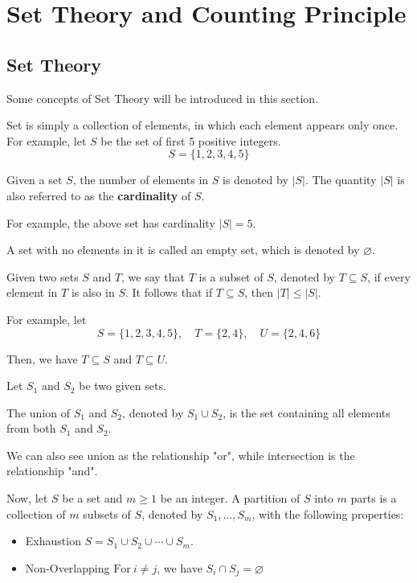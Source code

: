 \chapter{Set Theory and Counting Principle}

\section{Set Theory}

Some concepts of Set Theory will be introduced in this section.

Set is simply a collection of elements, in which each element appears only once. 
For example, let \(S\) be the set of first 5 positive integers.
\[
    S = \{1, 2, 3, 4, 5\}
\]

Given a set \(S\), the number of elements in \(S\) is denoted by \(\vert S \vert \). The quantity \(\vert S \vert \) is also referred to as the \textbf{cardinality} of \(S\).

For example, the above set has cardinality \(\vert S \vert = 5\). 

A set with no elements in it is called an empty set, which is denoted by \(\varnothing\).

Given two sets \(S\) and \(T\), we say that \(T\) is a subset of \(S\), denoted by \(T \subseteq S\), if every element in \(T\) is also in \(S\). It follows that if \(T \subseteq S\), then \(\vert T \vert \leq \vert S \vert \). 

For example, let
\[
    S = \{1, 2, 3, 4, 5\},\quad T = \{2, 4\}, \quad U = \{2, 4, 6\}
\]

Then, we have \(T \subseteq S\) and \(T \subseteq U\).

Let \(S_1\) and \(S_2\) be two given sets. 

The union of \(S_1\) and \(S_2\), denoted by \(S_1 \cup  S_2\), is the set containing all elements from both \(S_1\) and \(S_2\). 

We can also see union as the relationship "or", while intersection is the relationship "and".

Now, let \(S\) be a set and \(m \geq 1\) be an integer. A partition of \(S\) into \(m\) parts is a collection of \(m\) subsets of \(S\), denoted by \(S_1, \dots, S_m\), with the following properties:
\begin{itemize}
    \item Exhaustion \(S = S_1 \cup S_2 \cup \cdots \cup S_m.\)
    \item Non-Overlapping \(\text{For}\ i \neq j\), we have \(S_i \cap S_j = \varnothing\)
\end{itemize}